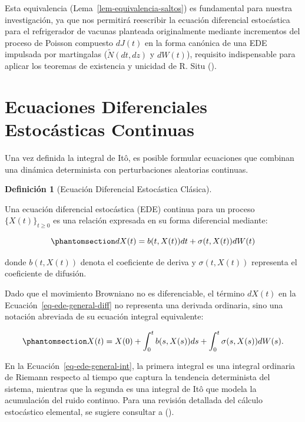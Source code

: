 \documentclass[
  spanish,
  us-letterpaper,
]{scrreprt}
\numberwithin{equation}{section}
\theoremstyle{plain}
\theoremstyle{plain}
\theoremstyle{plain}
\theoremstyle{definition}
\newtheorem{definition}{Definición}[chapter]
\theoremstyle{remark}
\begin{document}
Esta equivalencia (Lema~\ref{lem-equivalencia-saltos}) es fundamental
para nuestra investigación, ya que nos permitirá reescribir la ecuación
diferencial estocástica para el refrigerador de vacunas planteada
originalmente mediante incrementos del proceso de Poisson compuesto
\(dJ(t)\) en la forma canónica de una EDE impulsada por martingalas
(\(\tilde{N}(dt, dz)\) y \(dW(t)\)), requisito indispensable para
aplicar los teoremas de existencia y unicidad de R. Situ
().

\section{Ecuaciones Diferenciales Estocásticas
Continuas}\label{ecuaciones-diferenciales-estocuxe1sticas-continuas}

Una vez definida la integral de Itô, es posible formular ecuaciones que
combinan una dinámica determinista con perturbaciones aleatorias
continuas.

\begin{definition}[Ecuación Diferencial Estocástica
Clásica]\protect\hypertarget{def-ede-general}{}\label{def-ede-general}

Una ecuación diferencial estocástica (EDE) continua para un proceso
\(\{X(t)\}_{t \ge 0}\) es una relación expresada en su forma diferencial
mediante:

\begin{equation}\phantomsection\label{eq-ede-general-diff}{
dX(t) = b(t, X(t)) dt + \sigma(t, X(t)) dW(t)
}\end{equation}

donde \(b(t, X(t))\) denota el coeficiente de deriva y
\(\sigma(t, X(t))\) representa el coeficiente de difusión.

\end{definition}

Dado que el movimiento Browniano no es diferenciable, el término
\(dX(t)\) en la Ecuación~\ref{eq-ede-general-diff} no representa una
derivada ordinaria, sino una notación abreviada de su ecuación integral
equivalente:

\begin{equation}\phantomsection\label{eq-ede-general-int}{
X(t) = X(0) + \int_0^t b(s, X(s)) ds + \int_0^t \sigma(s, X(s)) dW(s).
}\end{equation}

En la Ecuación~\ref{eq-ede-general-int}, la primera integral es una
integral ordinaria de Riemann respecto al tiempo que captura la
tendencia determinista del sistema, mientras que la segunda es una
integral de Itô que modela la acumulación del ruido continuo. Para una
revisión detallada del cálculo estocástico elemental, se sugiere
consultar a ().
\end{document}
